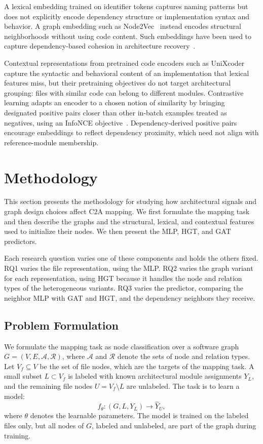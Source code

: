A lexical embedding trained on identifier tokens captures naming patterns but does not explicitly encode dependency structure or implementation syntax and behavior. A graph embedding such as Node2Vec~\cite{node2vec} instead encodes structural neighborhoods without using code content. Such embeddings have been used to capture dependency-based cohesion in architecture recovery~\cite{negar,structsar}.

Contextual representations from pretrained code encoders such as UniXcoder~\cite{unixcoder} capture the syntactic and behavioral content of an implementation that lexical features miss, but their pretraining objectives do not target architectural grouping: files with similar code can belong to different modules. Contrastive learning adapts an encoder to a chosen notion of similarity by bringing designated positive pairs closer than other in-batch examples treated as negatives, using an InfoNCE objective~\cite{infonce}. Dependency-derived positive pairs encourage embeddings to reflect dependency proximity, which need not align with reference-module membership.
\section{Methodology\label{sec:method}}

This section presents the methodology for studying how architectural signals and graph design choices affect C2A mapping. We first formulate the mapping task and then describe the graphs and the structural, lexical, and contextual features used to initialize their nodes. We then present the MLP, HGT, and GAT predictors.
 
Each research question varies one of these components and holds the others fixed. RQ1 varies the file representation, using the MLP. RQ2 varies the graph variant for each representation, using HGT because it handles the node and relation types of the heterogeneous variants. RQ3 varies the predictor, comparing the neighbor MLP with GAT and HGT, and the dependency neighbors they receive.

\subsection{Problem Formulation\label{sec:problem}}
We formulate the mapping task as node classification over a software graph $G=(V, E,\mathcal{A},\mathcal{R})$, where $\mathcal{A}$ and $\mathcal{R}$ denote the sets of node and relation types. Let $V_f \subseteq V$ be the set of file nodes, which are the targets of the mapping task. A small subset $L \subset V_f$ is labeled with known architectural module assignments $Y_L$, and the remaining file nodes $U = V_f \setminus L$ are unlabeled. The task is to learn a model:
\begin{equation}
    f_{\theta}: (G, L, Y_L) \rightarrow \hat{Y}_U,
\end{equation}
where $\theta$ denotes the learnable parameters. The model is trained on the labeled files only, but all nodes of $G$, labeled and unlabeled, are part of the graph during training.
 
